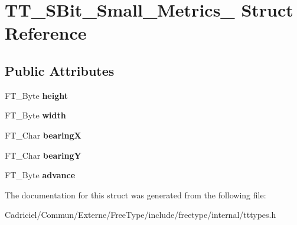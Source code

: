\hypertarget{struct_t_t___s_bit___small___metrics__}{\section{T\-T\-\_\-\-S\-Bit\-\_\-\-Small\-\_\-\-Metrics\-\_\- Struct Reference}
\label{struct_t_t___s_bit___small___metrics__}
}
\subsection*{Public Attributes}
\begin{DoxyCompactItemize}
\item 
\hypertarget{struct_t_t___s_bit___small___metrics___aecc44b5e504d5ce27521505ed53420c8}{F\-T\-\_\-\-Byte {\bfseries height}}\label{struct_t_t___s_bit___small___metrics___aecc44b5e504d5ce27521505ed53420c8}

\item 
\hypertarget{struct_t_t___s_bit___small___metrics___ad2401ae208b1663d0085ca06a04885fe}{F\-T\-\_\-\-Byte {\bfseries width}}\label{struct_t_t___s_bit___small___metrics___ad2401ae208b1663d0085ca06a04885fe}

\item 
\hypertarget{struct_t_t___s_bit___small___metrics___a4361ae83a66706852c0c7d4c4ddff9c2}{F\-T\-\_\-\-Char {\bfseries bearing\-X}}\label{struct_t_t___s_bit___small___metrics___a4361ae83a66706852c0c7d4c4ddff9c2}

\item 
\hypertarget{struct_t_t___s_bit___small___metrics___aba8cbfd6203f4083b8fb305f88d6d1fc}{F\-T\-\_\-\-Char {\bfseries bearing\-Y}}\label{struct_t_t___s_bit___small___metrics___aba8cbfd6203f4083b8fb305f88d6d1fc}

\item 
\hypertarget{struct_t_t___s_bit___small___metrics___a056c5ea71ec3339ca9b7356ea7c90e37}{F\-T\-\_\-\-Byte {\bfseries advance}}\label{struct_t_t___s_bit___small___metrics___a056c5ea71ec3339ca9b7356ea7c90e37}

\end{DoxyCompactItemize}


The documentation for this struct was generated from the following file\-:\begin{DoxyCompactItemize}
\item 
Cadriciel/\-Commun/\-Externe/\-Free\-Type/include/freetype/internal/tttypes.\-h\end{DoxyCompactItemize}
